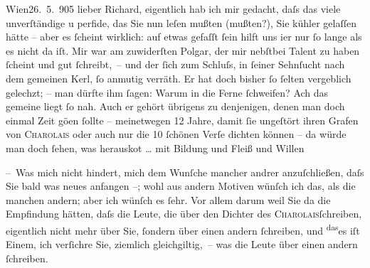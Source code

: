 \pstart
           \raggedleft{}{\pb}Wien26. 5. 905\pend
           \vspace{0.5em}
\pstart
           lieber Richard, eigentlich hab ich mir gedacht, daſs das viele
               unverſtändige u perfide, das Sie nun leſen mußten (mußten?), Sie kühler gelaſſen
               hätte – aber es{ }ſcheint wirklich: auf etwas gefaſſt{ }ſein hilft uns i{\geminationm}er nur{ }ſo lange als es nicht da iſt. Mir war am
               zuwiderſten Polgar, der mir nebſtbei Talent zu
               haben{ }ſcheint und gut{ }ſchreibt, – und der{ }ſich zum Schluſs, in{ }ſeiner Sehnſucht {\pb}nach dem gemeinen Kerl,{ }ſo anmutig verräth. Er hat
               doch bisher{ }ſo{ }ſelten vergeblich gelechzt; – man dürfte ihm{ }ſagen: Warum in die Ferne{ }ſchweifen? Ach das gemeine liegt{ }ſo nah. Auch er gehört übrigens zu denjenigen, denen
               man doch einmal Zeit gö{\geminationn}en{ }ſollte – meinetwegen 12
               Jahre, damit{ }ſie ungeſtört ihren Grafen von \textsc{Charolais} oder auch nur die 10{ }ſchönen Verſe dichten können – da{\geminationn} würde man doch {\pb}ſehen,
               was herausko{\geminationm}t {\dots} mit Bildung
               und Fleiß und Willen {\dotsfour}\pend
           
\pstart
           – Was mich nicht hindert, mich dem Wunſche mancher andrer anzuſchließen, daſs Sie
               bald was neues anfangen –; wohl aus andern Motiven wünſch ich das, als die manchen
               andern; aber ich wünſch es{ }ſehr. Vor allem darum weil Sie da{\geminationn} die Empfindung hätten, daſs die Leute, die über den
               Dichter des \textsc{Charolais}ſchreiben, eigentlich nicht mehr über Sie,{ }ſondern über {\pb}einen andern{ }ſchreiben, und \substVorne{}\textsuperscript{das}\substDazwischen{}es\substHinten{} iſt Einem, ich verſichre Sie,  ziemlich gleichgiltig, – was die Leute über einen andern{ }ſchreiben.\pend
           
